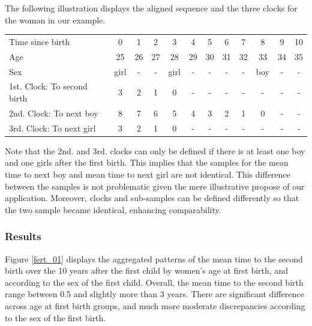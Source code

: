 \documentclass{article}
\begin{document}
The following illustration displays the aligned sequence and the three clocks for the woman in our example.

\begin{center}
\begin{tabular}{l|ccccccccccc}
\hline
    Time since birth & 0 & 1 & 2 & 3 & 4 & 5 & 6 & 7 & 8 & 9 & 10 \\
    Age & 25 & 26 & 27 & 28 & 29 & 30 & 31 & 32 & 33 & 34 & 35 \\
    Sex & girl & - & - & girl & - & - & - & - & boy & - & - \\
    1st. Clock: To second birth & 3 & 2 & 1 & 0 & - & - & - & - & - & - & - \\
    2nd. Clock: To next boy & 8 & 7 & 6 & 5 & 4 & 3 & 2 & 1 & 0 & - & - \\
    3rd. Clock: To next girl & 3 & 2 & 1 & 0 & - & - & - & - & - & - & - \\\hline
\end{tabular}
\end{center}

Note that the 2nd. and 3rd. clocks can only be defined if there is at least one boy and one girls after the first birth. This implies that the samples for the mean time to next boy and mean time to next girl are not identical. This difference between the samples is not problematic given the mere illustrative propose of our application. Moreover, clocks and sub-samples can be defined differently so that the two sample became identical, enhancing comparability.


\subsubsection{Results}
Figure \ref{fert_01} displays the aggregated patterns of the mean time to the second birth over the 10 years after the first child by women's age at first birth, and according to the sex of the first child. Overall, the mean time to the second birth range between 0.5 and slightly more than 3 years. There are significant difference across age at first birth groups, and much more moderate discrepancies according to the sex of the first birth.
\end{document}
